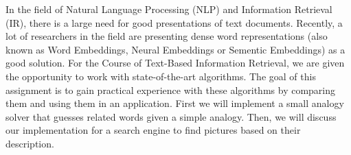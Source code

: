 In the field of Natural Language Processing (NLP) and Information Retrieval (IR), there is a large need for good presentations of text documents. Recently, a lot of researchers in the field are presenting dense word representations (also known as Word Embeddings, Neural Embeddings or Sementic Embeddings) as a good solution.
For the Course of Text-Based Information Retrieval, we are given the opportunity to work with state-of-the-art algorithms. The goal of this assignment is to gain practical experience with these algorithms by comparing them and using them in an application. 
First we will implement a small analogy solver that guesses related words given a simple analogy. Then, we will discuss our implementation for a search engine to find pictures based on their description.
